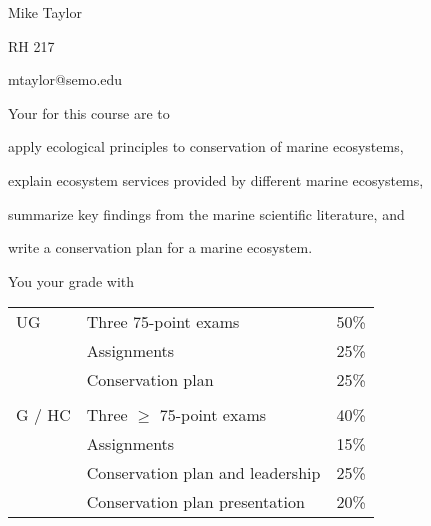 \documentclass[t]{beamer}
\begin{document}

{
\begin{frame}[t]
\end{frame}
}

{
\begin{frame}[t,plain]
\large
\vspace{5ex}

\hangpara Mike Taylor

\hangpara RH 217

\hangpara mtaylor@semo.edu

\end{frame}
}

\begin{frame}[t]{Your  for this course are to}

	\hangpara apply ecological principles to conservation of marine ecosystems,

	\hangpara explain ecosystem services provided by different marine ecosystems, 

	\hangpara summarize key findings from the marine scientific literature, and
	
	\hangpara write a conservation plan for a marine ecosystem.
		
\end{frame}


\begin{frame}[t]{You  your grade with}
	\begin{center}\large\begin{tabular}{@{}lll@{}}
	UG		&	Three 75-point exams 				& 	50\% \\
			&	Assignments 						& 	25\% \\
			&	Conservation plan 					& 	25\% \\
			&										&	\\
	G / HC	&	Three $\geq$ 75-point exams 		& 	40\% \\
			&	Assignments 						& 	15\% \\
			&	Conservation plan and leadership 	&	25\% \\
			&	Conservation plan presentation 		&	20\% \\
	\end{tabular}
	\end{center}
\end{frame}
\end{document}
